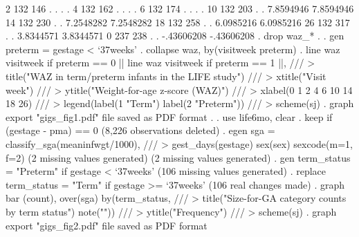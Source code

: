   {\VBAR}        2       132   146         .         .            .            . {\VBAR}
  {\VBAR}        4       132   162         .         .            .            . {\VBAR}
  {\VBAR}        6       132   174         .         .            .            . {\VBAR}
  {\VBAR}       10       132   203         .         .    7.8594946    7.8594946 {\VBAR}
  {\VBAR}       14       132   230         .         .    7.2548282    7.2548282 {\VBAR}
  {\VBAR}       18       132   258         .         .    6.0985216    6.0985216 {\VBAR}
  {\VBAR}       26       132   317         .         .    3.8344571    3.8344571 {\VBAR}
  {\VBAR}        0       237   238         .         .   -.43606208   -.43606208 {\VBAR}
  {\BLC}
{\smallskip}
. drop waz_*
{\smallskip}
. 
. gen preterm = gestage < `37weeks'
{\smallskip}
. collapse waz, by(visitweek preterm)
{\smallskip}
. line waz visitweek if preterm == 0 || line waz visitweek if preterm == 1 ||, ///
>     title("WAZ in term/preterm infants in the LIFE study") ///
>     xtitle("Visit week") ///
>     ytitle("Weight-for-age z-score (WAZ)") ///
>     xlabel(0 1 2 4 6 10 14 18 26) ///
>     legend(label(1 "Term") label(2 "Preterm")) ///
>     scheme(sj)
{\smallskip}
. graph export "gigs_fig1.pdf"
file{} saved as PDF format
{\smallskip}
. 
. use life6mo, clear
{\smallskip}
. keep if (gestage - pma) == 0
(8,226 observations deleted)
{\smallskip}
. egen sga = classify_sga(meaninfwgt/1000), ///
>     gest_days(gestage) sex(sex) sexcode(m=1, f=2)
(2 missing values generated)
(2 missing values generated)
{\smallskip}
. gen term_status = "Preterm" if gestage < `37weeks'
(106 missing values generated)
{\smallskip}
. replace term_status = "Term" if gestage >= `37weeks'
(106 real changes made)
{\smallskip}
. graph bar (count), over(sga) by(term_status, ///
>     title("Size-for-GA category counts by term status") note("")) ///
>     ytitle("Frequency") ///
>     scheme(sj)
{\smallskip}
. graph export "gigs_fig2.pdf"
file{} saved as PDF format
{\smallskip}
